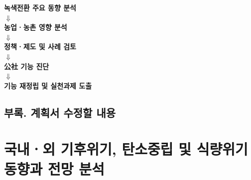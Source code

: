 \begin{center}
\textbf{녹색전환 주요 동향 분석}
\\[0.5em]
$\Downarrow$
\\[0.5em]
\textbf{농업ㆍ농촌 영향 분석}
\\[0.5em]
$\Downarrow$
\\[0.5em]
\textbf{정책ㆍ제도 및 사례 검토}
\\[0.5em]
$\Downarrow$
\\[0.5em]
\textbf{公社 기능 진단}
\\[0.5em]
$\Downarrow$
\\[0.5em]
\textbf{기능 재정립 및 실천과제 도출}
\end{center}




\newpage

\subsection*{부록. 계획서 수정할 내용}
\section{국내ㆍ외 기후위기, 탄소중립 및 식량위기 동향과 전망 분석}

